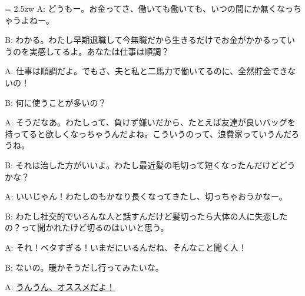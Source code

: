 \documentclass[11pt]{amsart}
\title{}
\author{}
\newenvironment{hangall}[1]{\hangindent = 2.5zw\everypar{\hangindent = 2.5zw}}{}
\begin{document}
\maketitle
\begin{hangall}{}%
A: どうもー。お金ってさ、働いても働いても、いつの間にか無くなっちゃうよねー。

B: わかる。わたし早期退職して今無職だから生きるだけでお金がかかるっていうのを実感してるよ。あなたは仕事は順調？

A: 仕事は順調だよ。でもさ、夫と私と二馬力で働いてるのに、全然貯金できないの！

B: 何に使うことが多いの？

A: そうだなあ。わたしって、負けず嫌いだから、たとえば友達が良いバッグを持ってると欲しくなっちゃうんだよね。こういうのって、浪費家っていうんだろうね。

B: それは治した方がいいよ。わたし最近髪の毛切って短くなったんだけどどうかな？

A: いいじゃん！わたしのもかなり長くなってきたし、切っちゃおうかなー。

B: わたし社交的でいろんな人と話すんだけど髪切ったら大体の人に失恋したの？って聞かれたけど切るのはいいと思う。

A: それ！ベタすぎる！いまだにいるんだね、そんなこと聞く人！

B: ないの。暖かそうだし行ってみたいな。

A: \ul{うんうん、オススメだよ！}\end{hangall}
\end{document}
